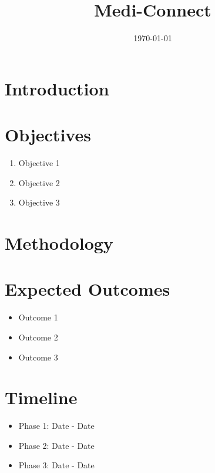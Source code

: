 \documentclass{article}
\title{Medi-Connect}
\author{}
\date{\today}
\begin{document}
\maketitle

\section{Introduction}

\lipsum[1] %

\section{Objectives}

\begin{enumerate}
    \item Objective 1
    \item Objective 2
    \item Objective 3
\end{enumerate}

\section{Methodology}

\lipsum[2] %

\section{Expected Outcomes}

\begin{itemize}
    \item Outcome 1
    \item Outcome 2
    \item Outcome 3
\end{itemize}

\section{Timeline}

\begin{itemize}
    \item Phase 1: Date - Date
    \item Phase 2: Date - Date
    \item Phase 3: Date - Date
\end{itemize}
\end{document}
